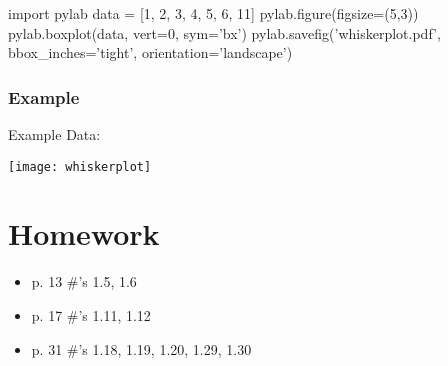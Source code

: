 \documentclass{article}
\begin{document}
\begin{pycode}
import pylab
data = [1, 2, 3, 4, 5, 6, 11]
pylab.figure(figsize=(5,3))
pylab.boxplot(data, vert=0, sym='bx')
pylab.savefig('whiskerplot.pdf', bbox_inches='tight', orientation='landscape')
\end{pycode}

\subsubsection{Example}
Example Data: 
\begin{center}
\texttt{[image: whiskerplot]}
\end{center}

\section{Homework}
\begin{itemize}
\item p. 13 \#'s 1.5, 1.6
\item p. 17 \#'s 1.11, 1.12
\item p. 31 \#'s 1.18, 1.19, 1.20, 1.29, 1.30
\end{itemize}


\newpage
\nocite{textbook}
\printbibliography
\end{document}
